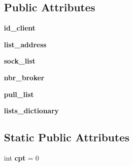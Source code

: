 \subsection*{Public Attributes}
\begin{DoxyCompactItemize}
\item 
\hypertarget{classorg_1_1swallow__labs_1_1model_1_1_client_1_1_client_aa1b9db614dafd1c78c5c02846a6f6095}{}{\bfseries id\+\_\+client}\label{classorg_1_1swallow__labs_1_1model_1_1_client_1_1_client_aa1b9db614dafd1c78c5c02846a6f6095}

\item 
\hypertarget{classorg_1_1swallow__labs_1_1model_1_1_client_1_1_client_aa1c95ff2f7906c4bb40432fc145670ab}{}{\bfseries list\+\_\+address}\label{classorg_1_1swallow__labs_1_1model_1_1_client_1_1_client_aa1c95ff2f7906c4bb40432fc145670ab}

\item 
\hypertarget{classorg_1_1swallow__labs_1_1model_1_1_client_1_1_client_a4cd216428d2ba58070bd3c162425f686}{}{\bfseries sock\+\_\+list}\label{classorg_1_1swallow__labs_1_1model_1_1_client_1_1_client_a4cd216428d2ba58070bd3c162425f686}

\item 
\hypertarget{classorg_1_1swallow__labs_1_1model_1_1_client_1_1_client_ab49af80de652554b9ac58266d0e1b04e}{}{\bfseries nbr\+\_\+broker}\label{classorg_1_1swallow__labs_1_1model_1_1_client_1_1_client_ab49af80de652554b9ac58266d0e1b04e}

\item 
\hypertarget{classorg_1_1swallow__labs_1_1model_1_1_client_1_1_client_a353c434d848b6713f66f940df08a0198}{}{\bfseries pull\+\_\+list}\label{classorg_1_1swallow__labs_1_1model_1_1_client_1_1_client_a353c434d848b6713f66f940df08a0198}

\item 
\hypertarget{classorg_1_1swallow__labs_1_1model_1_1_client_1_1_client_abf20192df349971a3d8a8e5a0118be64}{}{\bfseries lists\+\_\+dictionary}\label{classorg_1_1swallow__labs_1_1model_1_1_client_1_1_client_abf20192df349971a3d8a8e5a0118be64}

\end{DoxyCompactItemize}
\subsection*{Static Public Attributes}
\begin{DoxyCompactItemize}
\item 
\hypertarget{classorg_1_1swallow__labs_1_1model_1_1_client_1_1_client_a1ef135df1c96ec4bacfd82986effccda}{}int {\bfseries cpt} = 0\label{classorg_1_1swallow__labs_1_1model_1_1_client_1_1_client_a1ef135df1c96ec4bacfd82986effccda}

\end{DoxyCompactItemize}


